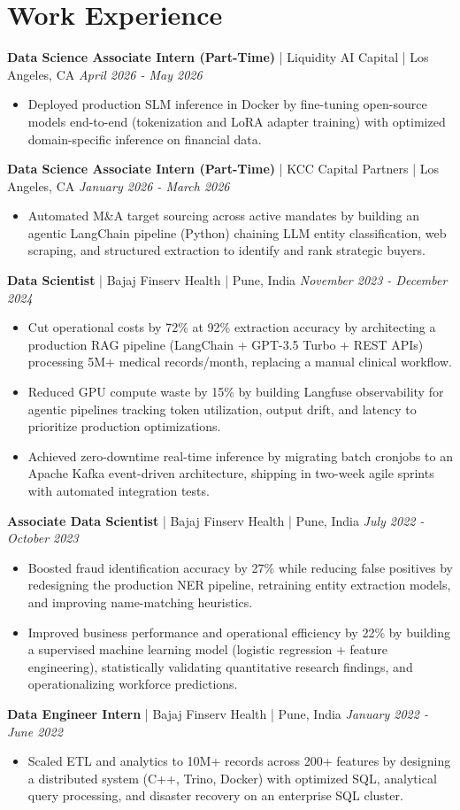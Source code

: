 \documentclass[9pt,letterpaper]{article}
\newenvironment{workitems}{%
  \begin{itemize}[after={\vspace{6pt}}]
}{%
  \end{itemize}
}
\newcommand{\jobtitle}[4]{%
  \noindent
  {\small\textbf{#1}} {\small\color{headgray}| #2 | #3}%
  \hfill
  {\small\color{headgray}\textit{#4}}\\[-7pt]
}
\begin{document}
\section{Work Experience}
\jobtitle{Data Science Associate Intern (Part-Time)}{Liquidity AI Capital}{Los Angeles, CA}{April 2026 - May 2026}
\begin{workitems}
  \item Deployed production SLM inference in Docker by fine-tuning open-source models end-to-end (tokenization and LoRA adapter training) with optimized domain-specific inference on financial data.
\end{workitems}
\jobtitle{Data Science Associate Intern (Part-Time)}{KCC Capital Partners}{Los Angeles, CA}{January 2026 - March 2026}
\begin{workitems}
  \item Automated M\&A target sourcing across active mandates by building an agentic LangChain pipeline (Python) chaining LLM entity classification, web scraping, and structured extraction to identify and rank strategic buyers.
\end{workitems}
\jobtitle{Data Scientist}{Bajaj Finserv Health}{Pune, India}{November 2023 - December 2024}
\begin{workitems}
  \item Cut operational costs by 72\% at 92\% extraction accuracy by architecting a production RAG pipeline (LangChain + GPT-3.5 Turbo + REST APIs) processing 5M+ medical records/month, replacing a manual clinical workflow.
  \item Reduced GPU compute waste by 15\% by building Langfuse observability for agentic pipelines tracking token utilization, output drift, and latency to prioritize production optimizations.
  \item Achieved zero-downtime real-time inference by migrating batch cronjobs to an Apache Kafka event-driven architecture, shipping in two-week agile sprints with automated integration tests.
\end{workitems}
\jobtitle{Associate Data Scientist}{Bajaj Finserv Health}{Pune, India}{July 2022 - October 2023}
\begin{workitems}
  \item Boosted fraud identification accuracy by 27\% while reducing false positives by redesigning the production NER pipeline, retraining entity extraction models, and improving name-matching heuristics.
  \item Improved business performance and operational efficiency by 22\% by building a supervised machine learning model (logistic regression + feature engineering), statistically validating quantitative research findings, and operationalizing workforce predictions.
\end{workitems}
\jobtitle{Data Engineer Intern}{Bajaj Finserv Health}{Pune, India}{January 2022 - June 2022}
\begin{workitems}
  \item Scaled ETL and analytics to 10M+ records across 200+ features by designing a distributed system (C++, Trino, Docker) with optimized SQL, analytical query processing, and disaster recovery on an enterprise SQL cluster.
\end{workitems}
\end{document}
